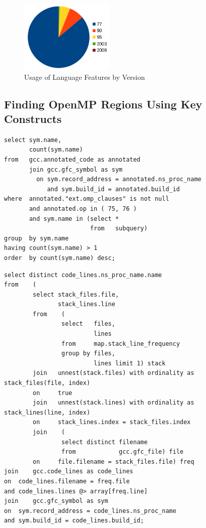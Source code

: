 \begin{figure}
\begin{center}
\includegraphics[width=0.4\textwidth]{images/cp2k-fortran-versions.png}
\end{center}
\caption{Usage of Language Features by Version}
\label{fig:fortran-versions}
\end{figure}

\subsection{Finding OpenMP Regions Using Key Constructs}

\begin{lstlisting}[caption=foo, label=lst:foo]
select sym.name,
       count(sym.name)
from   gcc.annotated_code as annotated
       join gcc.gfc_symbol as sym
         on sym.record_address = annotated.ns_proc_name
            and sym.build_id = annotated.build_id
where  annotated."ext.omp_clauses" is not null
       and annotated.op in ( 75, 76 )
       and sym.name in (select *
                        from   subquery)
group  by sym.name
having count(sym.name) > 1
order  by count(sym.name) desc;  
\end{lstlisting}

\begin{lstlisting}[caption=foo, label=lst:bar]
select distinct code_lines.ns_proc_name.name
from	(
		select stack_files.file,
		       stack_lines.line
		from	(
				select   files,
				         lines
				from     map.stack_line_frequency
				group by files,
				         lines limit 1) stack
		join   unnest(stack.files) with ordinality as stack_files(file, index)
		on     true
		join   unnest(stack.lines) with ordinality as stack_lines(line, index)
		on     stack_lines.index = stack_files.index
		join	(
				select distinct filename
				from            gcc.gfc_file) file
		on     file.filename = stack_files.file) freq
join	gcc.code_lines as code_lines
on	code_lines.filename = freq.file
and	code_lines.lines @> array[freq.line]
join	gcc.gfc_symbol as sym
on	sym.record_address = code_lines.ns_proc_name
and	sym.build_id = code_lines.build_id;
\end{lstlisting}

